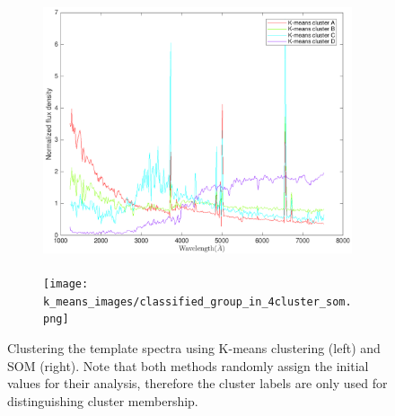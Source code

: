     \begin{figure}
    \begin{subfigure}[b]{0.49\textwidth}
        \centering
        \includegraphics[width=.99\textwidth, height=         7.5cm]{k_means_images/classified_group_in_4cluster_kinney_1.pdf}
    \end{subfigure}
    \hfill
        \begin{subfigure}[b]{0.49\textwidth}
        \centering \texttt{[image: k\_means\_images/classified\_group\_in\_4cluster\_som.png]}
    \end{subfigure}
    \caption{Clustering the  template spectra using K-means clustering (left) and SOM (right). Note that both methods randomly assign the initial values for their analysis, therefore the cluster labels are only used for distinguishing cluster membership.}
    \label{fig: som_k_means_4}
    \end{figure}
        
